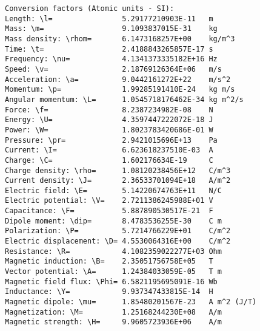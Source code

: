 \documentclass[12pt,a4paper,twoside]{report}
\begin{document}
{\begin{tcolorbox}
\begin{verbatim}
Conversion factors (Atomic units - SI):
Length: \l=                5.29177210903E-11   m
Mass: \m=                  9.1093837015E-31    kg
Mass density: \rhom=       6.1473168257E+00    kg/m^3
Time: \t=                  2.4188843265857E-17 s
Frequency: \nu=            4.1341373335182E+16 Hz
Speed: \v=                 2.18769126364E+06   m/s
Acceleration: \a=          9.0442161272E+22    m/s^2
Momentum: \p=              1.99285191410E-24   kg m/s
Angular momentum: \L=      1.0545718176462E-34 kg m^2/s
Force: \f=                 8.2387234982E-08    N
Energy: \U=                4.3597447222072E-18 J
Power: \W=                 1.8023783420686E-01 W
Pressure: \pr=             2.9421015696E+13    Pa
Current: \I=               6.623618237510E-03  A
Charge: \C=                1.602176634E-19     C
Charge density: \rho=      1.08120238456E+12   C/m^3
Current density: \J=       2.36533701094E+18   A/m^2
Electric field: \E=        5.14220674763E+11   N/C
Electric potential: \V=    2.7211386245988E+01 V
Capacitance: \F=           5.887890530517E-21  F
Dipole moment: \dip=       8.4783536255E-30    C m
Polarization: \P=          5.7214766229E+01    C/m^2
Electric displacement: \D= 4.5530064316E+00    C/m^2
Resistance: \R=            4.1082359022277E+03 Ohm
Magnetic induction: \B=    2.35051756758E+05   T
Vector potential: \A=      1.24384033059E-05   T m
Magnetic field flux: \Phi= 6.5821195695091E-16 Wb
Inductance: \Y=            9.937347433815E-14  H
Magnetic dipole: \mu=      1.85480201567E-23   A m^2 (J/T)
Magnetization: \M=         1.25168244230E+08   A/m
Magnetic strength: \H=     9.9605723936E+06    A/m


\end{verbatim}
\end{tcolorbox}}
\end{document}
